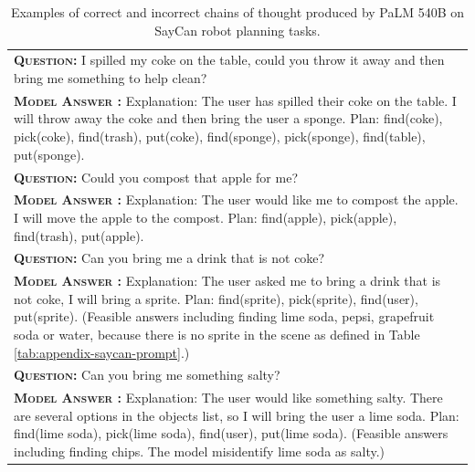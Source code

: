 \documentclass[]{article}
\newcommand{\xmark}{\ding{55}}%
\theoremstyle{plain}
\theoremstyle{definition}
\theoremstyle{remark}
\newcommand{\palm}[0]{PaLM}
\begin{document}
\endgroup
{}
\begingroup
\begin{table}[h]
    \centering
    \small
    \caption{
    Examples of correct and incorrect chains of thought produced by \palm{} 540B on SayCan robot planning tasks.
    }
    \begin{tabular}{p{\linewidth}}
        \toprule
        \vspace{-2mm}
        \textbf{\textsc{Question:}} I spilled my coke on the table, could you throw it away and then bring me something to help clean? \\
        \vspace{-1mm}
        \textbf{\textsc{Model Answer \color{darkGreen}{(CORRECT)}:}} Explanation: The user has spilled their coke on the table. I will throw away the coke and then bring the user a sponge. Plan: find(coke), pick(coke), find(trash), put(coke), find(sponge), pick(sponge), find(table), put(sponge). \color{darkGreen}{\checkmark} \\
        \midrule
        \textbf{\textsc{Question:}} Could you compost that apple for me? \\
        \vspace{-1mm}
        \textbf{\textsc{Model Answer \color{darkGreen}{(CORRECT)}:}} Explanation: The user would like me to compost the apple. I will move the apple to the compost.  Plan: find(apple), pick(apple), find(trash), put(apple). \color{darkGreen}{\checkmark} \\
        \midrule
        \textbf{\textsc{Question:}} Can you bring me a drink that is not coke? \\
        \vspace{-1mm}
        \textbf{\textsc{Model Answer \color{blue}{(INCORRECT)}:}} Explanation: The user asked me to bring a drink that is not coke, I will bring a sprite. Plan: find(sprite), pick(sprite), find(user), put(sprite). {\color{blue} \xmark{} (Feasible answers including finding lime soda, pepsi, grapefruit soda or water, because there is no sprite in the scene as defined in Table \ref{tab:appendix-saycan-prompt}.)} \\
        \midrule
        \textbf{\textsc{Question:}} Can you bring me something salty? \\
        \vspace{-1mm}
        \textbf{\textsc{Model Answer \color{blue}{(INCORRECT)}:}} Explanation: The user would like something salty. There are several options in the objects list, so I will bring the user a lime soda.  Plan: find(lime soda), pick(lime soda), find(user), put(lime soda). {\color{blue} \xmark{} (Feasible answers including finding chips. The model misidentify lime soda as salty.)} \\
        \bottomrule
    \end{tabular}
    \label{tab:appendix-saycan-examples}
\end{table}
\endgroup
\end{document}

